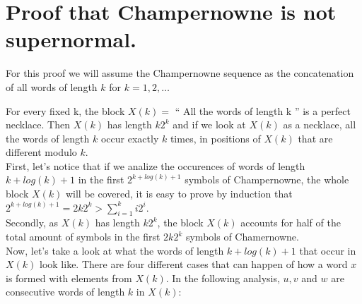 \documentclass[10pt, a4paper]{article}
\theoremstyle{definition}
\begin{document}
\section{Proof that Champernowne is not supernormal.}


For this proof we will assume the Champernowne sequence as the concatenation of all words of length $k$ for $k = 1,2,\dots$ 

For every fixed k, the block $X(k) = $ `` All the words of length k '' is a perfect necklace. Then $X(k)$ has length $k2^k$ and if we look at $X(k)$  as a necklace, all the words of length $k$ occur exactly $k$ times, in positions of $X(k)$ that are different modulo $k$.
\\

First, let's notice that if we analize the occurences of words of length $k + log(k) + 1$ in the first $2^{k + log(k) + 1}$ symbols of Champernowne, the whole block $X(k)$ will be covered, it is easy to prove by induction that $2^{k + log(k) + 1} = 2k2^k > \sum_{i=1}^k i2^i$.
\\

Secondly, as $X(k)$ has length $k2^k$, the block $X(k)$ accounts for half of the total amount of symbols in the first $2k2^k$ symbols of Chamernowne.
\\

Now, let's take a look at what the words of length $k + log(k) + 1$ that occur in $X(k)$ look like. There are four different cases that can happen of how a word $x$ is formed with elements from $X(k)$. 
In the following analysis, $u, v$ and $w$ are consecutive words of length $k$ in $X(k)$:
\end{document}
